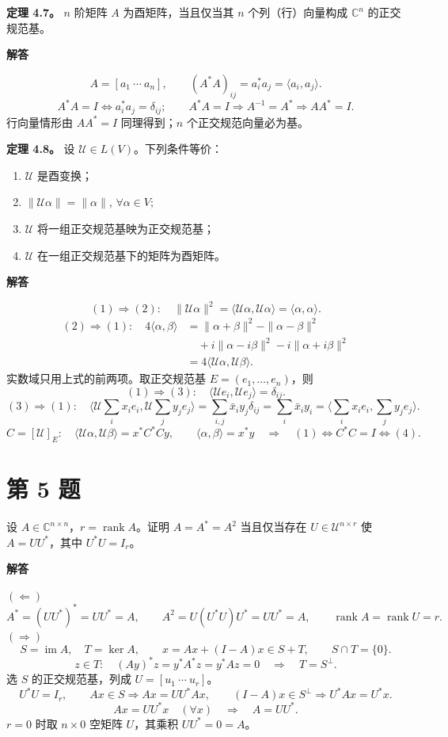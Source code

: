 \documentclass[UTF8,10pt,letterpaper,fontset=fandol]{ctexart}
\newcommand{\C}{\mathbb C}
\newcommand{\ip}[2]{\langle #1,#2\rangle}
\DeclareMathOperator{\rank}{rank}
\DeclareMathOperator{\im}{im}
\begin{document}
\textbf{定理 4.7。} $n$ 阶矩阵 $A$ 为酉矩阵，当且仅当其 $n$ 个列（行）向量构成 $\C^n$ 的正交规范基。
\par{}\textbf{解答}\par

\[
 A=[a_1\ \cdots\ a_n],\qquad
 (A^*A)_{ij}=a_i^*a_j=\ip{a_i}{a_j}.
\]
\[
 A^*A=I\iff a_i^*a_j=\delta_{ij};\qquad
 A^*A=I\Longrightarrow A^{-1}=A^*\Longrightarrow AA^*=I.
\]
行向量情形由 $AA^*=I$ 同理得到；$n$ 个正交规范向量必为基。

\medskip
\textbf{定理 4.8。} 设 $\mathcal U\in L(V)$。下列条件等价：
\begin{enumerate}
\item $\mathcal U$ 是酉变换；
\item $\|\mathcal U\alpha\|=\|\alpha\|$, $\forall\alpha\in V$;
\item $\mathcal U$ 将一组正交规范基映为正交规范基；
\item $\mathcal U$ 在一组正交规范基下的矩阵为酉矩阵。
\end{enumerate}

\par{}\textbf{解答}\par

\[
 (1)\Longrightarrow(2):\quad
 \|\mathcal U\alpha\|^2=\ip{\mathcal U\alpha}{\mathcal U\alpha}=\ip\alpha\alpha.
\]
\begin{align*}
 (2)\Longrightarrow(1):\quad
 4\ip\alpha\beta
 &=\|\alpha+\beta\|^2-\|\alpha-\beta\|^2\\
 &\quad+i\|\alpha-i\beta\|^2-i\|\alpha+i\beta\|^2\\
 &=4\ip{\mathcal U\alpha}{\mathcal U\beta}.
\end{align*}
实数域只用上式的前两项。取正交规范基 $E=(e_1,\ldots,e_n)$，则
\[
 (1)\Longrightarrow(3):\quad
 \ip{\mathcal Ue_i}{\mathcal Ue_j}=\delta_{ij}.
\]
\[
 (3)\Longrightarrow(1):\quad
 \ip{\mathcal U\sum_i x_ie_i}{\mathcal U\sum_j y_je_j}
 =\sum_{i,j}\bar x_i y_j\delta_{ij}
 =\sum_i\bar x_i y_i=\ip{\sum_i x_ie_i}{\sum_j y_je_j}.
\]
\[
 C=[\mathcal U]_E:\quad
 \ip{\mathcal U\alpha}{\mathcal U\beta}=x^*C^*Cy,\qquad
 \ip\alpha\beta=x^*y
 \quad\Longrightarrow\quad (1)\iff C^*C=I\iff(4).
\]
\section{第 5 题}
设 $A\in\C^{n\times n}$，$r=\rank A$。证明 $A=A^*=A^2$ 当且仅当存在 $U\in\mathcal U^{n\times r}$ 使 $A=UU^*$，其中 $U^*U=I_r$。
\par{}\textbf{解答}\par

\textbf{$(\Leftarrow)$}
\[
 A^*=(UU^*)^*=UU^*=A,\qquad
 A^2=U(U^*U)U^*=UU^*=A,\qquad \rank A=\rank U=r.
\]
\textbf{$(\Rightarrow)$}
\[
 S=\im A,\quad T=\ker A,\qquad
 x=Ax+(I-A)x\in S+T,\qquad S\cap T=\{0\}.
\]
\[
 z\in T:\quad (Ay)^*z=y^*A^*z=y^*Az=0
 \quad\Longrightarrow\quad T=S^\perp.
\]
选 $S$ 的正交规范基，列成 $U=[u_1\ \cdots\ u_r]$。
\[
 U^*U=I_r,\qquad Ax\in S\Longrightarrow Ax=UU^*Ax,
 \qquad (I-A)x\in S^\perp\Longrightarrow U^*Ax=U^*x.
\]
\[
 Ax=UU^*x\quad(\forall x)\quad\Longrightarrow\quad\boxed{A=UU^*}.
\]
$r=0$ 时取 $n\times0$ 空矩阵 $U$，其乘积 $UU^*=0=A$。
\end{document}
